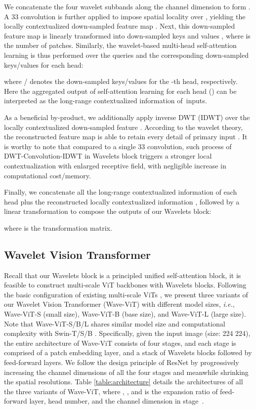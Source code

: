\documentclass[runningheads]{llncs}
\begin{document}
We concatenate the four wavelet subbands along the channel dimension to form . A 33 convolution is further applied to impose spatial locality over , yielding the locally contextualized down-sampled feature map . Next, this down-sampled feature map  is linearly transformed into down-sampled keys  and values , where  is the number of patches. Similarly, the wavelet-based multi-head self-attention learning  is thus performed over the queries and the corresponding down-sampled keys/values for each head:

where / denotes the down-sampled keys/values for the -th head, respectively. Here the aggregated output of self-attention learning for each head () can be interpreted as the long-range contextualized information of~inputs.

As a beneficial by-product, we additionally apply inverse DWT (IDWT) over the locally contextualized down-sampled feature . According to the wavelet theory, the reconstructed feature map  is able to retain every detail of primary input . It is worthy to note that compared to a single 33 convolution, such process of DWT-Convolution-IDWT in Wavelets block triggers a stronger local contextualization with enlarged receptive field, with negligible increase in computational cost/memory.

Finally, we concatenate all the long-range contextualized information of each head plus the reconstructed locally contextualized information , followed by a linear transformation to compose the outputs of our Wavelets block:

where  is the transformation matrix.



\subsection{Wavelet Vision Transformer}

Recall that our Wavelets block is a principled unified self-attention block, it is feasible to construct multi-scale ViT backbones with Wavelets blocks. Following the basic configuration of existing multi-scale ViTs \cite{liu2021swin,wang2021pyramid}, we present three variants of our Wavelet Vision Transformer (Wave-ViT) with different model sizes, \emph{i.e.}, Wave-ViT-S (small size), Wave-ViT-B (base size), and Wave-ViT-L (large size). Note that Wave-ViT-S/B/L shares similar model size and computational complexity with Swin-T/S/B \cite{liu2021swin}. Specifically, given the input image (size: 224  224), the entire architecture of Wave-ViT consists of four stages, and each stage is comprised of a patch embedding layer, and a stack of Wavelets blocks followed by feed-forward layers. We follow the design principle of ResNet \cite{he2016deep} by progressively increasing the channel dimensions of all the four stages and meanwhile shrinking the spatial resolutions. Table \ref{table:architecture} details the architectures of all the three variants of Wave-ViT, where , , and  is the expansion ratio of feed-forward layer, head number, and the channel dimension in stage~.
\end{document}

